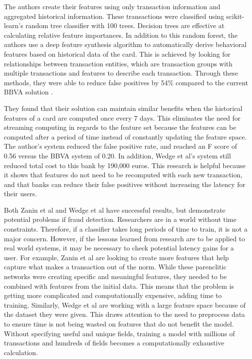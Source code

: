 \documentclass[midd]{thesis}
\begin{document}
The authors create their features using only transaction information and aggregated historical information. These transactions were classified using scikit-learn's random tree classifier with 100 trees. Decision trees are effective at calculating relative feature importances. In addition to this random forest, the authors use a deep feature synthesis algorithm to automatically derive behavioral features based on historical data of the card. This is achieved by looking for relationships between transaction entities, which are transaction groups with multiple transactions and features to describe each transaction. Through these methods, they were able to reduce false positives by 54\% compared to the current BBVA solution \cite{Wedge}. 

They found that their solution can maintain similar benefits when the historical features of a card are computed once every 7 days. This eliminates the need for streaming computing in regards to the feature set because the features can be computed after a period of time instead of constantly updating the feature space. The author's system reduced the false positive rate, and reached an F score of 0.56 versus the BBVA system of 0.20. In addition, Wedge et al's system still reduced total cost to this bank by 190,000 euros. This research is helpful because it shows that features do not need to be recomputed with each new transaction, and that banks can reduce their false positives without increasing the latency for their users.

Both Zanin et al and Wedge et al have successful results, but demonstrate potential problems if fraud detection. Researchers are in a world without time constraints. Therefore, if a classifier takes long periods of time to train, it is not a major concern. However, if the lessons learned from research are to be applied to real world systems, it may be necessary to check potential latency gains for a user. For example, Zanin et al are looking to create more features that help capture what makes a transaction out of the norm. While these parenclitic networks were creating specific and meaningful features, they needed to be combined with features from the initial data. This means that the problem is getting more complicated and computationally expensive, adding time to training. Similarly, Wedge et al are working with a large feature space because of the dataset they were given. This draws attention to the need to preprocess data to ensure time is not being wasted on features that do not benefit the model. Without specifying useful and unique fields, training a model with millions of transactions and hundreds of fields becomes a computationally exhaustive calculation.
\end{document}
